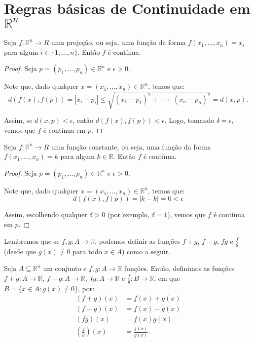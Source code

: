 \section{Regras básicas de Continuidade em $\mathbb R^n$}


\begin{proposition}
    Seja $f: \mathbb R^n\rightarrow R$ uma projeção, ou seja, uma função da forma $f(x_1, \dots, x_n) = x_i$ para algum $i \in \{1, \dots, n\}$.
    Então $f$ é contínua.
\end{proposition}
\begin{proof}
    Seja $p=(p_1, \dots, p_n) \in \mathbb R^n$ e $\epsilon>0$.

    Note que, dado qualquer $x=(x_1, \dots, x_n) \in \mathbb R^n$, temos que:
    \begin{equation*}
        d(f(x), f(p)) = |x_i - p_i| \leq \sqrt{(x_1 - p_1)^2 + \cdots + (x_n - p_n)^2} = d(x, p).
    \end{equation*}

    Assim, se $d(x, p)<\epsilon$, então $d(f(x), f(p))<\epsilon$.
    Logo, tomando $\delta=\epsilon$, vemos que $f$ é contínua em $p$.
\end{proof}

\begin{proposition}
    Seja $f: \mathbb R^n\rightarrow R$ uma função constante, ou seja, uma função da forma $f(x_1, \dots, x_n) = k$ para algum $k \in \mathbb R$.
    Então $f$ é contínua.
\end{proposition}
\begin{proof}
    Seja $p=(p_1, \dots, p_n) \in \mathbb R^n$ e $\epsilon>0$.

    Note que, dado qualquer $x=(x_1, \dots, x_n) \in \mathbb R^n$, temos que:
    \begin{equation*}
        d(f(x), f(p)) = |k-k|=0<\epsilon
    \end{equation*}

    Assim, escolhendo qualquer $\delta>0$ (por exemplo, $\delta=1$), vemos que $f$ é contínua em $p$.
\end{proof}

Lembremos que se $f, g: A \to \mathbb R$, podemos definir as funções $f+g$, $f-g$, $fg$ e $\frac{f}{g}$ (desde que $g(x)\neq 0$ para todo $x \in A$) como a seguir.

\begin{definition}
    Seja $A\subseteq \mathbb R^n$ um conjunto e $f, g: A \to \mathbb R$ funções.
    Então, definimos as funções $f+g:A\rightarrow \mathbb R$, $f-g:A\rightarrow \mathbb R$, $fg:A\rightarrow \mathbb R$ e $\frac{f}{g}:B\rightarrow \mathbb R$, em que $B=\{x \in A : g(x)\neq 0\}$, por:
    \begin{align*}
        (f+g)(x) &= f(x) + g(x) \\
        (f-g)(x) &= f(x) - g(x) \\
        (fg)(x) &= f(x)g(x) \\
        \left(\frac{f}{g}\right)(x) &= \frac{f(x)}{g(x)}.
    \end{align*}
\end{definition}

